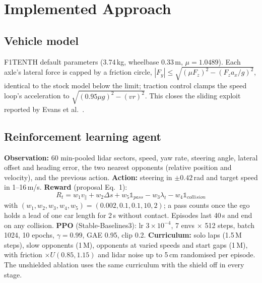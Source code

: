 \documentclass[conference]{IEEEtran}
\begin{document}
\section{Implemented Approach}
\subsection{Vehicle model}
F1TENTH default parameters (3.74\,kg, wheelbase 0.33\,m, $\mu = 1.0489$). Each axle's lateral force is capped by a
friction circle, $|F_y| \le \sqrt{(\mu F_z)^2 - (F_z a_x/g)^2}$, identical to the stock model below the limit;
traction control clamps the speed loop's acceleration to $\sqrt{(0.95\mu g)^2 - (v r)^2}$. This closes the
sliding exploit reported by Evans et al.~\cite{evans2023}.

\subsection{Reinforcement learning agent}
\textbf{Observation:} 60 min-pooled lidar sectors, speed, yaw rate, steering angle, lateral offset and heading
error, the two nearest opponents (relative position and velocity), and the previous action.
\textbf{Action:} steering in $\pm0.42$\,rad and target speed in 1--16\,m/s. \textbf{Reward} (proposal Eq.~1):
\begin{equation}
R_t = w_1 v_\parallel + w_2 \Delta s + w_5 \mathbb{1}_{pass} - w_3 \lambda_t - w_4 \mathbb{1}_{collision}
\end{equation}
with $(w_1,w_2,w_3,w_4,w_5) = (0.002, 0.1, 0.1, 10, 2)$; a pass counts once the ego holds a lead of one car
length for 2\,s without contact. Episodes last 40\,s and end on any collision.
\textbf{PPO} (Stable-Baselines3): lr $3\!\times\!10^{-4}$, 7 envs $\times$ 512 steps, batch 1024, 10 epochs,
$\gamma = 0.99$, GAE 0.95, clip 0.2. \textbf{Curriculum:} solo laps (1.5\,M steps), slow opponents (1\,M),
opponents at varied speeds and start gaps (1\,M), with friction $\times U(0.85, 1.15)$ and lidar noise up to
5\,cm randomised per episode. The unshielded ablation uses the same curriculum with the shield off in every stage.
\end{document}
